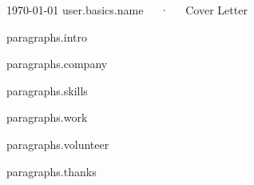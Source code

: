 \documentclass[11pt, a4paper]{awesome-cv}
\begin{document}
\makecvheader

\makecvfooter
  {\today}
  { {{user.basics.name}}~~~·~~~Cover Letter}
  {}

\makelettertitle

\begin{cvletter}

{{{paragraphs.intro}}}

{{{paragraphs.company}}}

{{{paragraphs.skills}}}

{{{paragraphs.work}}}

{{{paragraphs.volunteer}}}

{{{paragraphs.thanks}}}

\end{cvletter}


\makeletterclosing
\end{document}
